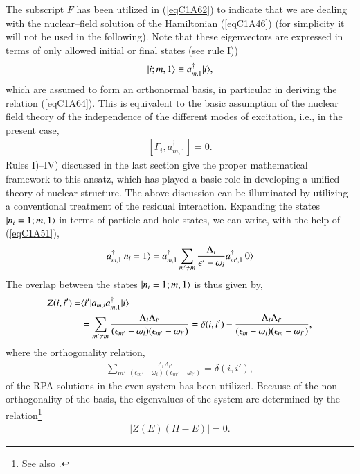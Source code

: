  
The subscript $F$ has been utilized in (\ref{eqC1A62}) to indicate that we are dealing with the nuclear--field solution of the Hamiltonian (\ref{eqC1A46}) (for simplicity it will not be used in the following). Note that these eigenvectors are expressed in terms of only  allowed initial or final states (see rule I)) 
\begin{align}\label{eqC1A65} 
 |{i;m,1} \rangle\equiv a^\dagger_{m,1}|{i} \rangle,
  \end{align}
which are assumed to form an orthonormal basis, in particular in deriving the 
relation (\ref{eqC1A64}). This is equivalent to the basic assumption of the nuclear field theory of the independence of the different modes of excitation, i.e., in the 
present case, 
\begin{align}\label{eqC1A66} 
 [\Gamma_i,a^\dagger_{m,1}]=0.
  \end{align}
Rules I)--IV) discussed in the last section give the proper mathematical framework to this ansatz, which has played a basic role in developing a unified theory of nuclear structure. 
The above discussion can be illuminated by utilizing a conventional treatment of the residual interaction. Expanding the states $|{n_i=1; m,1} \rangle$
in terms of particle and hole states, we can write, with the help of (\ref{eqC1A51}), 
\begin{align}\label{eqC1A66b} 
 a^\dagger_{m,1}|{n_i=1} \rangle=a^\dagger_{m,1}\sum_{m'\neq m}\frac{\Lambda_i}{\epsilon'-\omega_i}a^\dagger_{m',1}|{0} \rangle
  \end{align}
The overlap between the states $|{n_i=1; m,1} \rangle$ is thus given by, 
\begin{align}\label{eqC1A67} 
 \nonumber Z(i,i')=&\langle {i'|a_{m,i}a^\dagger_{m,1}|i} \rangle\\
 &=\sum_{m'\neq m}\frac{\Lambda_i\Lambda_{i'}}{(\epsilon_{m'}-\omega_i)(\epsilon_{m'}-\omega_{i'})}=\delta(i,i')-\frac{\Lambda_i\Lambda_{i'}}{(\epsilon_m-\omega_i)(\epsilon_m-\omega_{i'})},
  \end{align}
where the orthogonality relation,
\begin{align}\label{eqC1A68} 
 \sum_{m'}\frac{\Lambda_i\Lambda_{i'}}{(\epsilon_{m'}-\omega_i)(\epsilon_{m'}-\omega_{i'})}=\delta(i,i'),
  \end{align}
of the RPA solutions in the even system has been utilized. Because of the non--orthogonality of the basis, the eigenvalues of the system are determined 
by the relation\footnote{See also \cite{Broglia:76}.} 
\begin{align}\label{eqC1A69} 
 \left|Z(E)(H-E)\right|=0.
  \end{align}
